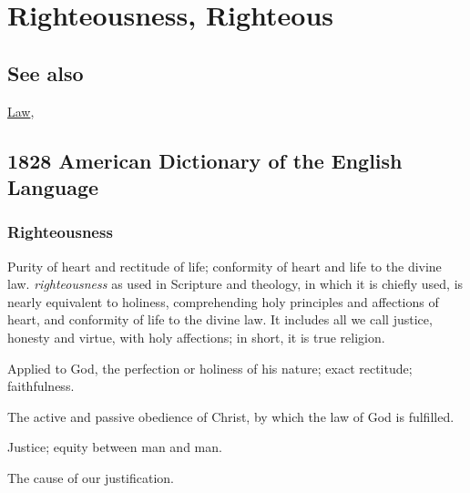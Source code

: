 \section{Righteousness, Righteous}
	\label{RIGHTEOUSNESS}
	
\subsection{See also}

	\hyperref[LAW]{Law},

\subsection{1828 American Dictionary of the English Language} %
	\label{RIGHTEOUSNESS-1828}
	
	\subsubsection{Righteousness}

		\begin{compactitem}
			\item[1] Purity of heart and rectitude of life; conformity of heart and life to the divine law. \textit{righteousness} as used in Scripture and theology, in which it is chiefly used, is nearly equivalent to holiness, comprehending holy principles and affections of heart, and conformity of life to the divine law. It includes all we call justice, honesty and virtue, with holy affections; in short, it is true religion.
			\item[2] Applied to God, the perfection or holiness of his nature; exact rectitude; faithfulness.
			\item[3] The active and passive obedience of Christ, by which the law of God is fulfilled.
			\item[4] Justice; equity between man and man.
			\item[5] The cause of our justification.
		\end{compactitem}



